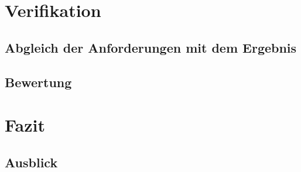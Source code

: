 \chapter{Verifikation}
\section{Abgleich der Anforderungen mit dem Ergebnis}
\section{Bewertung}

\chapter{Fazit}
\section{Ausblick}